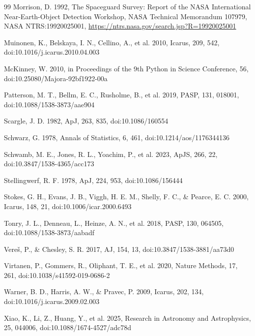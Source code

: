 \documentclass[referee]{raa}
\begin{document}
\begin{thebibliography}{99}
Morrison, D. 1992, The Spaceguard Survey: Report of the NASA International Near-Earth-Object Detection Workshop, NASA Technical Memorandum 107979, NASA NTRS:19920025001, \url{https://ntrs.nasa.gov/search.jsp?R=19920025001}

Muinonen, K., Belskaya, I. N., Cellino, A., et al. 2010, Icarus, 209, 542, doi:10.1016/j.icarus.2010.04.003

McKinney, W. 2010, in Proceedings of the 9th Python in Science Conference, 56, doi:10.25080/Majora-92bf1922-00a

Patterson, M. T., Bellm, E. C., Rusholme, B., et al. 2019, PASP, 131, 018001, doi:10.1088/1538-3873/aae904

Scargle, J. D. 1982, ApJ, 263, 835, doi:10.1086/160554

Schwarz, G. 1978, Annals of Statistics, 6, 461, doi:10.1214/aos/1176344136

Schwamb, M. E., Jones, R. L., Yoachim, P., et al. 2023, ApJS, 266, 22, doi:10.3847/1538-4365/acc173

Stellingwerf, R. F. 1978, ApJ, 224, 953, doi:10.1086/156444

Stokes, G. H., Evans, J. B., Viggh, H. E. M., Shelly, F. C., \& Pearce, E. C. 2000, Icarus, 148, 21, doi:10.1006/icar.2000.6493

Tonry, J. L., Denneau, L., Heinze, A. N., et al. 2018, PASP, 130, 064505, doi:10.1088/1538-3873/aabadf

Vere\v{s}, P., \& Chesley, S. R. 2017, AJ, 154, 13, doi:10.3847/1538-3881/aa73d0

Virtanen, P., Gommers, R., Oliphant, T. E., et al. 2020, Nature Methods, 17, 261, doi:10.1038/s41592-019-0686-2

Warner, B. D., Harris, A. W., \& Pravec, P. 2009, Icarus, 202, 134, doi:10.1016/j.icarus.2009.02.003

Xiao, K., Li, Z., Huang, Y., et al. 2025, Research in Astronomy and Astrophysics, 25, 044006, doi:10.1088/1674-4527/adc78d

\end{thebibliography}
\end{document}

